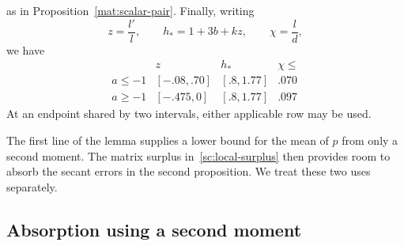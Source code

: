 \begin{lemma}
as in Proposition~\ref{mat:scalar-pair}.
Finally, writing
\begin{equation}\label{sc:derivative-functions}
 z=\frac{l'}{l},\qquad h_*=1+3b+kz,\qquad \chi=\frac{l}{d},
\end{equation}
we have
\begin{equation}\label{sc:derivative-table}
\begin{array}{c|ccc}
 &z&h_*&\chi\le\\\hline
 a\le-1&[-.08,.70]&[.8,1.77]&.070\\
 a\ge-1&[-.475,0]&[.8,1.77]&.097
\end{array}
\end{equation}
At an endpoint shared by two intervals, either applicable row may be used.
\end{lemma}

The first line of the lemma supplies a lower bound for the mean of $p$ from
only a second moment.  The matrix surplus in~\eqref{sc:local-surplus}
then provides room to absorb the secant errors in the second proposition.
We treat these two uses separately.

\subsection{Absorption using a second moment}\label{sc:absorption-proof}

